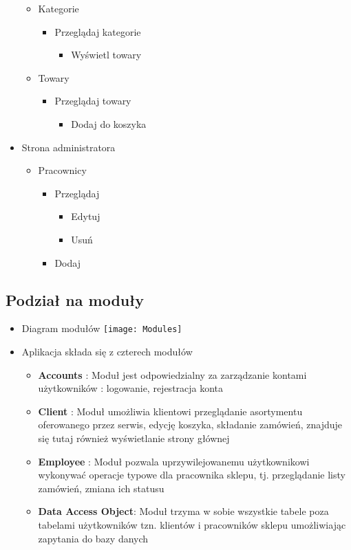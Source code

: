 \documentclass[10pt,a4paper]{article}
\begin{document}
\begin{itemize}
\begin{itemize}
		         \item Kategorie
		         \begin{itemize}
		         \item Przeglądaj kategorie
		         \begin{itemize}
		         \item Wyświetl towary
		         \end{itemize}
		         \end{itemize}
		         \item Towary
		         \begin{itemize}
		         \item Przeglądaj towary
		         \begin{itemize}
		         \item Dodaj do koszyka
		         \end{itemize}
		         \end{itemize}
		       \end{itemize}
		       \item Strona administratora
		       \begin{itemize}
		       \item Pracownicy
		       \begin{itemize}
		       \item Przeglądaj
		       \begin{itemize}
		         \item Edytuj
		         \item Usuń
		         \end{itemize}
		         \item Dodaj
		       \end{itemize}
		       \end{itemize}
		      \end{itemize}
\subsection{Podział na moduły}
\begin{itemize}
\item Diagram modułów
  \texttt{[image: Modules]}
 \item Aplikacja składa się z czterech modułów
 \begin{itemize}
   \item \textbf{Accounts} : Moduł jest odpowiedzialny za zarządzanie kontami użytkowników : logowanie, rejestracja konta
 \item \textbf{Client} : Moduł umożliwia klientowi przeglądanie asortymentu oferowanego przez serwis, edycję koszyka, składanie zamówień, znajduje się tutaj również wyświetlanie strony głównej
 \item \textbf{Employee} : Moduł pozwala uprzywilejowanemu użytkownikowi wykonywać operacje typowe dla pracownika sklepu, tj. przeglądanie listy zamówień, zmiana ich statusu
 \item \textbf{Data Access Object}: Moduł trzyma w sobie wszystkie tabele poza tabelami użytkowników tzn. klientów i pracowników sklepu umożliwiając zapytania do bazy danych
 \end{itemize}
\end{itemize}
\end{document}
